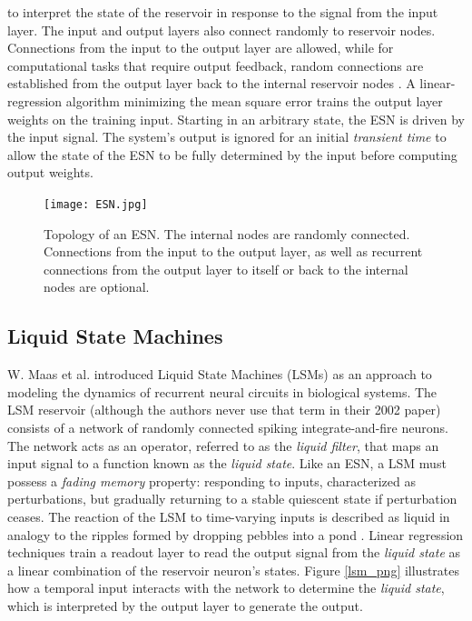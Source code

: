 \documentclass{article}
\begin{document}
    to interpret the state of the reservoir in response to the signal from the 
    input layer. The input and output layers also connect randomly to reservoir 
    nodes.  Connections from the input to the output layer are allowed, while 
    for computational tasks that require output feedback, random connections 
    are established from the output layer back to the internal reservoir nodes 
    \cite{jaeger2007echo}. A linear-regression algorithm minimizing the mean 
    square error trains the output layer weights on the training input.  
    Starting in an arbitrary state, the ESN is driven by the input signal. The 
    system's output is ignored for an initial \textit{transient time} to allow  
    the state of the ESN to be fully determined by the input before computing 
    output weights.
 

     \begin{figure}[h!]
        \centering
            \texttt{[image: ESN.jpg]}
    \caption{Topology of an ESN. The internal nodes are randomly connected. 
        Connections from the input to the output layer, as well as recurrent 
            connections from  the output layer to itself or back to the 
            internal nodes are optional. \cite{jaeger2001echo}} \label{esn_jpg}
            \end{figure}
 
    \subsection{Liquid State Machines}\label{lsm}
    W. Maas et al. introduced Liquid State Machines (LSMs)  as an approach to 
    modeling the dynamics of recurrent neural circuits in biological systems.  
    The LSM reservoir (although the authors never use that term in their 2002 
	    paper) consists of  a   network of randomly connected spiking 
    integrate-and-fire neurons. The network acts as an operator, referred to as 
    the \textit{liquid filter}, that maps an input signal to a function known 
    as the \textit{liquid state}. Like an ESN, a LSM must possess a 
    \textit{fading memory} property:   responding to inputs, characterized as 
    perturbations, but gradually returning to a stable quiescent state if 
    perturbation ceases.  The reaction of the LSM to time-varying inputs is 
    described as liquid in analogy to the ripples formed by dropping pebbles 
    into a pond \cite{maass2002real}.  Linear regression techniques train a 
    readout layer to read the output signal from the \textit{liquid state} as a 
    linear combination of the reservoir neuron's states.  Figure \ref{lsm_png} 
    illustrates how a temporal input interacts with the network to determine 
    the \textit{liquid state}, which is interpreted by the output layer to 
    generate the output.  \par
\end{document}
